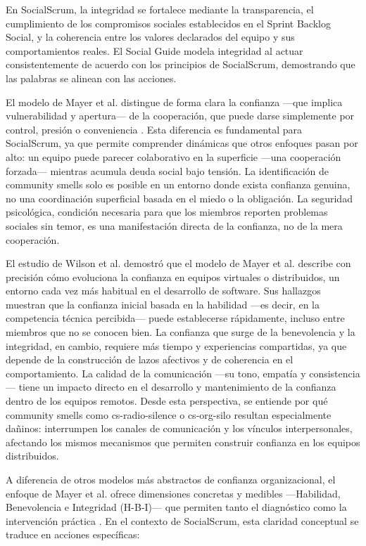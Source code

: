 En SocialScrum, la integridad se fortalece mediante la transparencia, el cumplimiento de los compromisos sociales establecidos en el Sprint Backlog Social, y la coherencia entre los valores declarados del equipo y sus comportamientos reales. El Social Guide modela integridad al actuar consistentemente de acuerdo con los principios de SocialScrum, demostrando que las palabras se alinean con las acciones.

El modelo de Mayer et al. distingue de forma clara la confianza —que implica vulnerabilidad y apertura— de la cooperación, que puede darse simplemente por control, presión o conveniencia \cite{mayer_integrative_1995}. Esta diferencia es fundamental para SocialScrum, ya que permite comprender dinámicas que otros enfoques pasan por alto: un equipo puede parecer colaborativo en la superficie —una cooperación forzada— mientras acumula deuda social bajo tensión. La identificación de community smells solo es posible en un entorno donde exista confianza genuina, no una coordinación superficial basada en el miedo o la obligación. La seguridad psicológica, condición necesaria para que los miembros reporten problemas sociales sin temor, es una manifestación directa de la confianza, no de la mera cooperación.

El estudio de Wilson et al. \cite{wilson_all_2006} demostró que el modelo de Mayer et al. describe con precisión cómo evoluciona la confianza en equipos virtuales o distribuidos, un entorno cada vez más habitual en el desarrollo de software. Sus hallazgos muestran que la confianza inicial basada en la habilidad —es decir, en la competencia técnica percibida— puede establecerse rápidamente, incluso entre miembros que no se conocen bien. La confianza que surge de la benevolencia y la integridad, en cambio, requiere más tiempo y experiencias compartidas, ya que depende de la construcción de lazos afectivos y de coherencia en el comportamiento. La calidad de la comunicación —su tono, empatía y consistencia— tiene un impacto directo en el desarrollo y mantenimiento de la confianza dentro de los equipos remotos. Desde esta perspectiva, se entiende por qué community smells como \gls{cs-radio-silence} o \gls{cs-org-silo} resultan especialmente dañinos: interrumpen los canales de comunicación y los vínculos interpersonales, afectando los mismos mecanismos que permiten construir confianza en los equipos distribuidos.

A diferencia de otros modelos más abstractos de confianza organizacional, el enfoque de Mayer et al. ofrece dimensiones concretas y medibles —Habilidad, Benevolencia e Integridad (H-B-I)— que permiten tanto el diagnóstico como la intervención práctica \cite{mayer_integrative_1995}. En el contexto de SocialScrum, esta claridad conceptual se traduce en acciones específicas:

